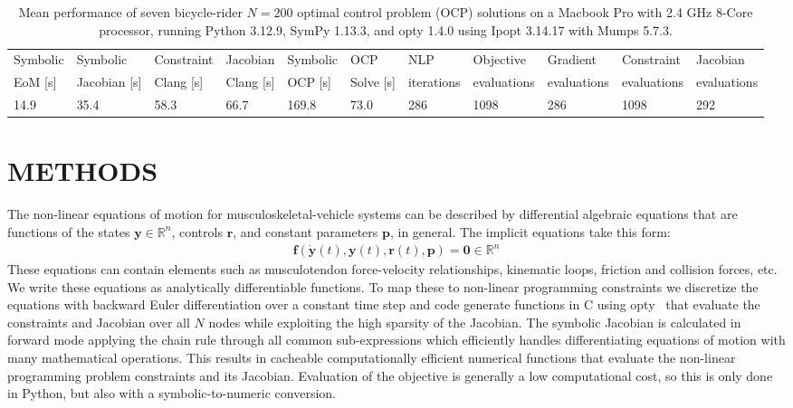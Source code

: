 \documentclass[11pt,twocolumn]{article}
\begin{document}
\begin{table}[t]
  \centering
  \caption{\small Mean performance of seven bicycle-rider \(N=200\) optimal
  control problem (OCP) solutions on a Macbook Pro with 2.4 GHz 8-Core
  processor, running Python 3.12.9, SymPy 1.13.3, and opty 1.4.0 using Ipopt
  3.14.17 with Mumps 5.7.3.}
  \scriptsize
  \begin{tabular}{lllllllllll}
    \toprule
    Symbolic &
    Symbolic &
    Constraint &
    Jacobian &
    Symbolic &
    OCP &
    NLP &
    Objective &
    Gradient &
    Constraint &
    Jacobian
    \\
    EoM [s] &
    Jacobian [s] &
    Clang [s] &
    Clang [s] &
    OCP [s] &
    Solve [s] &
    iterations &
    evaluations &
    evaluations &
    evaluations &
    evaluations
    \\
    \midrule
    14.9 &
    35.4 &
    58.3 &
    66.7 &
    169.8 &
    73.0 &
    286 &
    1098 &
    286 &
    1098 &
    292
    \\
    \bottomrule
  \end{tabular}
  \label{tab:performance}
\end{table}

\vspace{-1.5em}
\section*{METHODS}
\vspace{-1em}
%
The non-linear equations of motion for musculoskeletal-vehicle systems can be
described by differential algebraic equations that are functions of the states
\(\mathbf{y} \in \mathbb{R}^n\), controls \(\mathbf{r}\), and constant
parameters \(\mathbf{p}\), in general. The implicit equations take this form:
%
\begin{align}
  \mathbf{f}(\dot{\mathbf{y}}(t), \mathbf{y}(t), \mathbf{r}(t), \mathbf{p}) =
  \mathbf{0} \in \mathbb{R}^n
\end{align}
%
These equations can contain elements such as musculotendon force-velocity
relationships, kinematic loops, friction and collision forces, etc. We write
these equations as analytically differentiable functions. To map these to
non-linear programming constraints we discretize the equations with backward
Euler differentiation over a constant time step and code generate functions in
C using opty~\cite{Moore2018} that evaluate the constraints and Jacobian over
all \(N\) nodes while exploiting the high sparsity of the Jacobian. The
symbolic Jacobian is calculated in forward mode applying the chain rule through
all common sub-expressions which efficiently handles differentiating equations
of motion with many mathematical operations. This results in cacheable
computationally efficient numerical functions that evaluate the non-linear
programming problem constraints and its Jacobian. Evaluation of the objective is
generally a low computational cost, so this is only done in Python, but also
with a symbolic-to-numeric conversion.
\end{document}
